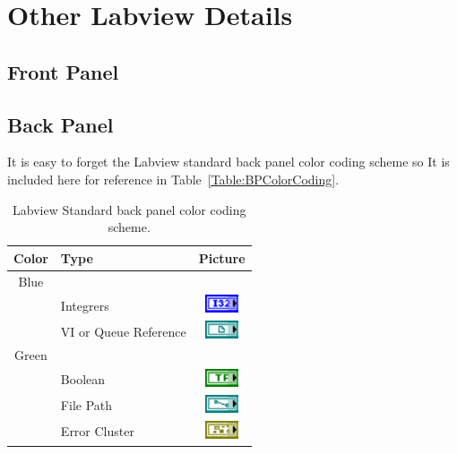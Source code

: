 
\chapter{Other Labview Details}
\label{CH-Other}

\section{Front Panel}
\section{Back Panel}

It is easy to forget the Labview standard back panel color coding scheme so It is included here for reference in Table~\ref{Table:BPColorCoding}. 

\begin{table}[h]
\centering
\caption{Labview Standard back panel color coding scheme.}
\begin{tabular}{clc}
\hline\hline
Color	& Type								& Picture														\\
\hline
Blue		& 									& 															\\\hline
		& Integrers							& \includegraphics[height=0.2in]{Figures/ColorCoding_Int}				\\\hline
		& VI or Queue Reference					& \includegraphics[height=0.2in]{Figures/ColorCoding_VIReference}			\\\hline
Green	&									&															\\\hline
		& Boolean								& \includegraphics[height=0.2in]{Figures/ColorCoding_Bool}				\\\hline
		& File Path							& \includegraphics[height=0.2in]{Figures/ColorCoding_FilePath}			\\\hline
		& Error Cluster							& \includegraphics[height=0.2in]{Figures/ColorCoding_Error}				\\\hline

\end{tabular}
\end{table}
